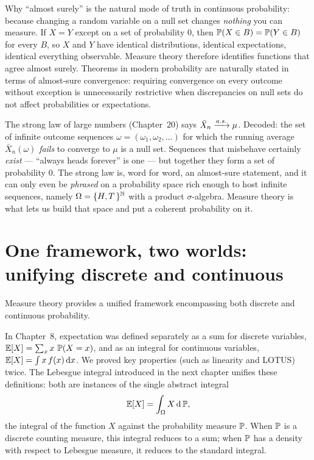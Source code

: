 \begin{focusbox}
Why ``almost surely'' is the natural mode of truth in continuous probability:
because changing a random variable on a null set changes \emph{nothing} you can
measure. If $X = Y$ except on a set of probability $0$, then
$\P(X \in B) = \P(Y \in B)$ for every $B$, so $X$ and $Y$ have identical
distributions, identical expectations, identical everything observable. Measure theory therefore identifies functions that agree almost surely.
Theorems in modern probability are naturally stated in terms of almost-sure
convergence: requiring convergence on every outcome without exception is
unnecessarily restrictive when discrepancies on null sets do not affect
probabilities or expectations.
\end{focusbox}

\begin{example}
\label{ch36:sln-reread}
The strong law of large numbers (Chapter~20) says
$\bar{X}_n \asto \mu$. Decoded: the set of infinite outcome sequences
$\omega = (\omega_1, \omega_2, \dots)$ for which the running average
$\bar{X}_n(\omega)$ \emph{fails} to converge to $\mu$ is a null set. Sequences
that misbehave certainly \emph{exist} --- ``always heads forever'' is one --- but
together they form a set of probability $0$. The strong law is, word for word, an
almost-sure statement, and it can only even be \emph{phrased} on a probability
space rich enough to host infinite sequences, namely
$\Omega = \set{H,T\,}^{\N}$ with a product $\sigma$-algebra. Measure theory is
what lets us build that space and put a coherent probability on it.
\end{example}

\section{One framework, two worlds: unifying discrete and continuous}
\label{ch36:unify}

Measure theory provides a unified framework encompassing both discrete and continuous
probability.

In Chapter~8, expectation was defined separately as a sum for discrete variables,
$\E[X] = \sum_x x\,\P(X=x)$, and as an integral for continuous variables,
$\E[X] = \int x\,f(x)\,\dd x$. We proved key properties (such as linearity and LOTUS)
twice. The Lebesgue integral introduced in the next chapter unifies these definitions:
both are instances of the single abstract integral
\[
  \E[X] = \int_{\Omega} X \,\dd\P,
\]
the integral of the function $X$ against the probability measure $\P$. When $\P$
is a discrete counting measure, this integral reduces to a sum; when $\P$ has a
density with respect to Lebesgue measure, it reduces to the standard integral.

